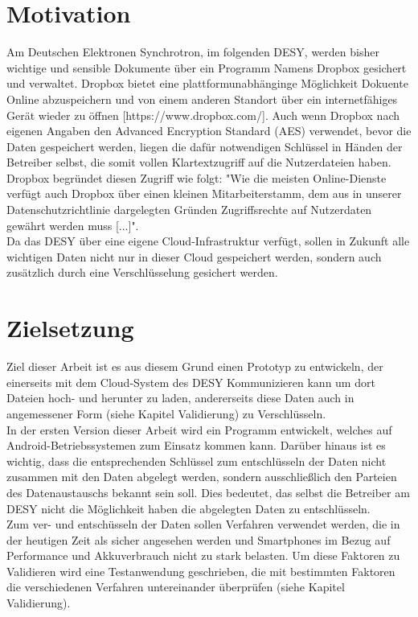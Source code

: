 \documentclass[10pt, a4paper]{scrreprt}
\begin{document}
\section{Motivation}
Am Deutschen Elektronen Synchrotron, im folgenden DESY, werden bisher wichtige und sensible Dokumente über ein Programm Namens Dropbox gesichert und verwaltet. Dropbox bietet eine plattformunabhänginge Möglichkeit Dokuente Online abzuspeichern und von einem anderen Standort über ein internetfähiges Gerät wieder zu öffnen [https://www.dropbox.com/]. Auch wenn Dropbox nach eigenen Angaben den Advanced Encryption Standard (AES)  verwendet, bevor die Daten gespeichert werden, liegen die dafür notwendigen Schlüssel in Händen der Betreiber selbst, die somit vollen Klartextzugriff auf die Nutzerdateien haben. Dropbox begründet diesen Zugriff wie folgt:  "Wie die meisten Online-Dienste verfügt auch Dropbox über einen kleinen Mitarbeiterstamm, dem aus in unserer Datenschutzrichtlinie dargelegten Gründen Zugriffsrechte auf Nutzerdaten gewährt werden muss [...]". \\ %
Da das DESY über eine eigene Cloud-Infrastruktur verfügt, sollen in Zukunft alle wichtigen Daten nicht nur in dieser Cloud gespeichert werden, sondern auch zusätzlich durch eine Verschlüsselung gesichert werden.


\section{Zielsetzung}
Ziel dieser Arbeit ist es aus diesem Grund einen Prototyp zu entwickeln, der einerseits mit dem Cloud-System des DESY Kommunizieren kann um dort Dateien hoch- und herunter zu laden, andererseits diese Daten auch in angemessener Form (siehe Kapitel Validierung) zu Verschlüsseln. \\
In der ersten Version dieser Arbeit wird ein Programm entwickelt, welches auf Android-Betriebssystemen zum Einsatz kommen kann. Darüber hinaus ist es wichtig, dass die entsprechenden Schlüssel zum entschlüsseln der Daten nicht zusammen mit den Daten abgelegt werden, sondern ausschließlich den Parteien des Datenaustauschs bekannt sein soll. Dies bedeutet, das selbst die Betreiber am DESY nicht die Möglichkeit haben die abgelegten Daten zu entschlüsseln. \\
Zum ver- und entschüsseln der Daten sollen Verfahren verwendet werden, die in der heutigen Zeit als sicher angesehen werden und Smartphones im Bezug auf Performance und Akkuverbrauch nicht zu stark belasten. Um diese Faktoren zu Validieren wird eine Testanwendung geschrieben, die mit bestimmten Faktoren die verschiedenen Verfahren untereinander überprüfen (siehe Kapitel Validierung).
\end{document}
